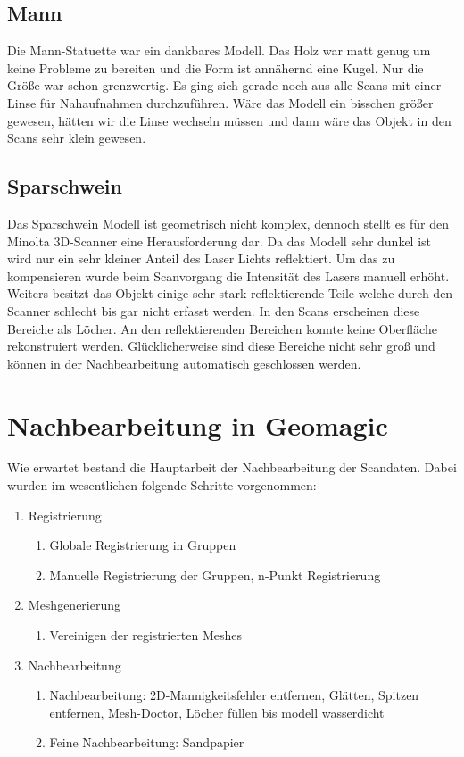 \documentclass[]{article}
\begin{document}
\subsection{Mann}
Die Mann-Statuette war ein dankbares Modell. Das Holz war matt genug um keine Probleme zu bereiten und die Form ist annähernd eine Kugel. Nur die Größe war schon grenzwertig. Es ging sich gerade noch aus alle Scans mit einer Linse für Nahaufnahmen durchzuführen. Wäre das Modell ein bisschen größer gewesen, hätten wir die Linse wechseln müssen und dann wäre das Objekt in den Scans sehr klein gewesen.

\subsection{Sparschwein}
Das Sparschwein Modell ist geometrisch nicht komplex, dennoch stellt es für den Minolta 3D-Scanner eine Herausforderung dar. Da das Modell sehr dunkel ist wird  nur ein sehr kleiner Anteil des Laser Lichts reflektiert. Um das zu kompensieren wurde beim Scanvorgang die Intensität des Lasers manuell erhöht. Weiters besitzt das Objekt einige sehr stark reflektierende Teile welche durch den Scanner schlecht bis gar nicht erfasst werden. In den Scans erscheinen diese Bereiche als Löcher. An den reflektierenden Bereichen konnte keine Oberfläche rekonstruiert werden. Glücklicherweise sind diese Bereiche nicht sehr groß und können in der Nachbearbeitung automatisch geschlossen werden.

\section{Nachbearbeitung in Geomagic} %

Wie erwartet bestand die Hauptarbeit der Nachbearbeitung der Scandaten. Dabei wurden im wesentlichen folgende Schritte vorgenommen:

\begin{enumerate}
\item Registrierung
\begin{enumerate}
\item Globale Registrierung in Gruppen
\item Manuelle Registrierung der Gruppen, n-Punkt Registrierung
\end{enumerate}
\item Meshgenerierung
\begin{enumerate}
\item Vereinigen der registrierten Meshes
\end{enumerate}
\item Nachbearbeitung
\begin{enumerate}
\item Nachbearbeitung: 2D-Mannigkeitsfehler entfernen, Glätten, Spitzen entfernen, Mesh-Doctor, Löcher füllen
bis modell wasserdicht
\item Feine Nachbearbeitung: Sandpapier
\end{enumerate}
\end{enumerate}
\end{document}
